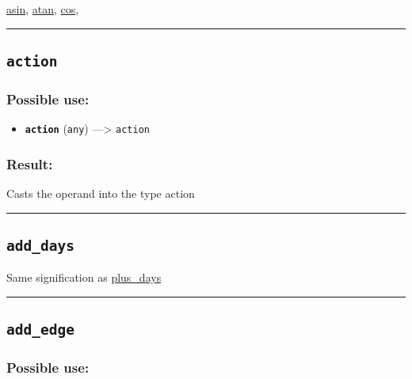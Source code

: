 \documentclass[]{book}
\providecommand{\tightlist}{%
  \setlength{\itemsep}{0pt}\setlength{\parskip}{0pt}}
\theoremstyle{definition}
\theoremstyle{definition}
\theoremstyle{definition}
\theoremstyle{remark}
\begin{document}
\href{operators-a-to-a.html\#asin}{asin},
\href{operators-a-to-a.html\#atan}{atan},
\href{operators-b-to-c.html\#cos}{cos},

\begin{center}\rule{0.5\linewidth}{\linethickness}\end{center}

\subsection{\texorpdfstring{\texttt{action}}{action}}\label{action}

\subsubsection{Possible use:}\label{possible-use-19}

\begin{itemize}
\tightlist
\item
  \textbf{\texttt{action}} (\texttt{any}) ---\textgreater{}
  \texttt{action}
\end{itemize}

\subsubsection{Result:}\label{result-18}

Casts the operand into the type action

\begin{center}\rule{0.5\linewidth}{\linethickness}\end{center}

\subsection{\texorpdfstring{\texttt{add\_days}}{add\_days}}\label{add_days}

Same signification as
\href{operators-n-to-r.html\#plus_days}{plus\_days}

\begin{center}\rule{0.5\linewidth}{\linethickness}\end{center}

\subsection{\texorpdfstring{\texttt{add\_edge}}{add\_edge}}\label{add_edge}

\subsubsection{Possible use:}\label{possible-use-20}
\end{document}
